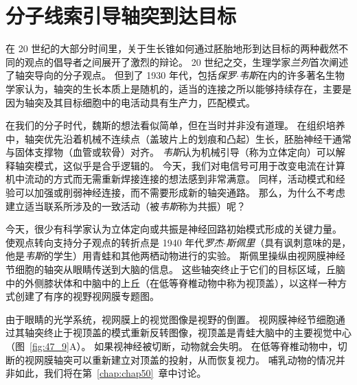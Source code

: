 \section{分子线索引导轴突到达目标}

在 20 世纪的大部分时间里，关于生长锥如何通过胚胎地形到达目标的两种截然不同的观点的倡导者之间展开了激烈的辩论。
20 世纪之交，生理学家\textit{兰列}首次阐述了轴突导向的分子观点。
但到了 1930 年代，包括\textit{保罗$\cdot$韦斯}在内的许多著名生物学家认为，轴突的生长本质上是随机的，适当的连接之所以能够持续存在，主要是因为轴突及其目标细胞中的电活动具有生产力，匹配模式。


在我们的分子时代，魏斯的想法看似简单，但在当时并非没有道理。
在组织培养中，轴突优先沿着机械不连续点（盖玻片上的划痕和凸起）生长，胚胎神经干通常与固体支撑物（血管或软骨）对齐。
\textit{韦斯}认为机械引导（称为立体定向）可以解释轴突模式，这似乎是合乎逻辑的。
今天，我们对电信号可用于改变电流在计算机中流动的方式而无需重新焊接连接的想法感到非常满意。
同样，活动模式和经验可以加强或削弱神经连接，而不需要形成新的轴突通路。
那么，为什么不考虑建立适当联系所涉及的一致活动（被\textit{韦斯}称为共振）呢？


今天，很少有科学家认为立体定向或共振是神经回路初始模式形成的关键力量。
使观点转向支持分子观点的转折点是 1940 年代\textit{罗杰$\cdot$斯佩里}（具有讽刺意味的是，他是\textit{韦斯}的学生）用青蛙和其他两栖动物进行的实验。
斯佩里操纵由视网膜神经节细胞的轴突从眼睛传送到大脑的信息。
这些轴突终止于它们的目标区域，丘脑中的外侧膝状体和中脑中的上丘（在低等脊椎动物中称为视顶盖），以这样一种方式创建了有序的视野视网膜专题图。


由于眼睛的光学系统，视网膜上的视觉图像是视野的倒置。
视网膜神经节细胞通过其轴突终止于视顶盖的模式重新反转图像，视顶盖是青蛙大脑中的主要视觉中心（图~\ref{fig:47_9}A）。
如果视神经被切断，动物就会失明。
在低等脊椎动物中，切断的视网膜轴突可以重新建立对顶盖的投射，从而恢复视力。
哺乳动物的情况并非如此，我们将在第~\ref{chap:chap50}~章中讨论。


